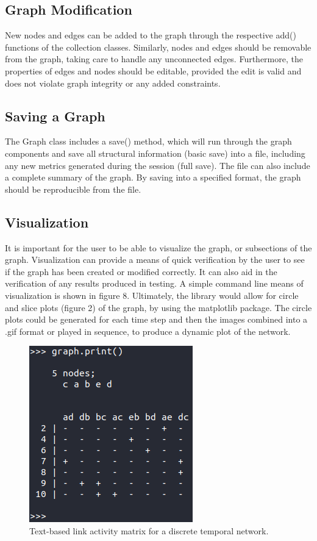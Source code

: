 \begin{design}
\subsection{Graph Modification}
New nodes and edges can be added to the graph through the respective add() functions of the collection classes. Similarly, nodes and edges should be removable from the graph, taking care to handle any unconnected edges. Furthermore, the properties of edges and nodes should be editable, provided the edit is valid and does not violate graph integrity or any added constraints. 
\subsection{Saving a Graph}
The Graph class includes a save() method, which will run through the graph components and save all structural information (basic save) into a file, including any new metrics generated during the session (full save). The file can also include a complete summary of the graph. By saving into a specified format, the graph should be reproducible from the file.
\subsection{Visualization}
It is important for the user to be able to visualize the graph, or subsections of the graph. Visualization can provide a means of quick verification by the user to see if the graph has been created or modified correctly. It can also aid in the verification of any results produced in testing. A simple command line means of visualization is shown in figure 8. Ultimately, the library would allow for circle \cite{circle_plot} and slice plots (figure 2) of the graph, by using the matplotlib package. The circle plots could be generated for each time step and then the images combined into a .gif format or played in sequence, to produce a dynamic plot of the network.
\clearpage
\begin{figure}[t]
    \centering
    \includegraphics[scale=0.7]{images/graph_print.PNG}
    \caption{Text-based link activity matrix for a discrete temporal network.}
\end{figure}

\end{design}
